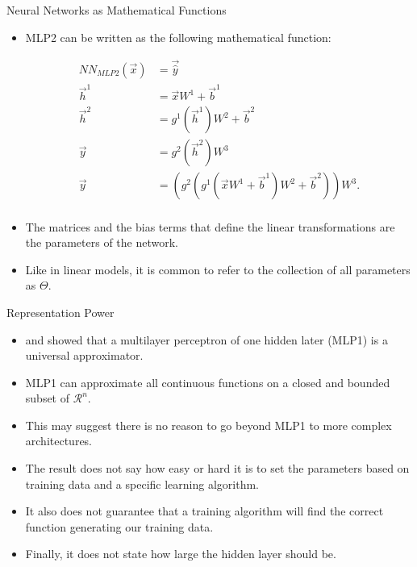 \documentclass[handout]{beamer}
\begin{document}
\begin{frame}{Neural Networks as Mathematical Functions}
\begin{scriptsize}
\begin{itemize}
\item MLP2 can be written as the following mathematical function:
\begin{center}
\begin{equation}
\begin{split}
NN_{MLP2}(\vec{x}) & =  \vec{\hat{y}}  \\
\vec{h}^{1} &  = \vec{x}W^{1}+\vec{b}^{1} \\
\vec{h}^{2} &  = g^{1}(\vec{h}^{1})W^{2}+\vec{b}^{2} \\
\vec{y} &  = g^{2}(\vec{h}^{2})W^{3}\\
\vec{y} &  = (g^2(g^1(\vec{x}W^{1}+\vec{b}^{1})W^2+\vec{b}^2))W^3.\\
\end{split}
\end{equation}
\end{center}
\item The matrices and the bias terms that define the linear transformations are the parameters of the network. 
\item Like in linear models, it is common to refer to the collection of all parameters as $\Theta$.
\end{itemize}
\end{scriptsize}
\end{frame}



\begin{frame}{Representation Power}
\begin{scriptsize}
\begin{itemize}
\item \cite{hornik1989multilayer} and \cite{cybenko1989approximation} showed that a multilayer perceptron of one hidden later (MLP1) is a universal approximator.
\item MLP1 can approximate all continuous functions on a closed and bounded subset of $\mathcal{R}^n$.
\item This may suggest there is no reason to go beyond MLP1 to more complex architectures.
\item The result does not say how easy or hard it is to set the parameters based on training data and a specific learning algorithm.
\item It also does not guarantee that a training algorithm will find
the correct function generating our training data.
\item Finally, it does not state how large the hidden layer should be.
\end{itemize}


\end{scriptsize}
\end{frame}
\end{document}
